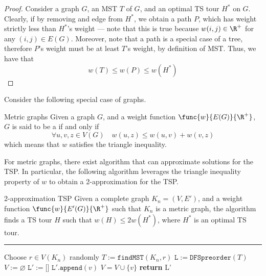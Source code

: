 \documentclass[a4paper, 12pt]{report}
\begin{document}
    \begin{proof}
        Consider a graph $G$, an MST $T$ of $G$, and an optimal TS tour $H^*$ on $G$. Clearly, if by removing and edge from $H^*$, we obtain a path $P$, which has weight strictly less than $H^*$'s weight --- note that this is true because $w(i, j) \in \R^+$ for any $(i, j) \in E(G)$. Moreover, note that a path is a special case of a tree, therefore $P$'s weight must be at least $T$'s weight, by definition of MST. Thus, we have that $$w(T) \le w(P) \le w(H^*)$$
    \end{proof}

    Consider the following special case of graphs.

    \begin{frameddefn}{Metric graphs}
        Given a graph $G$, and a weight function $\func{w}{E(G)}{\R^+}$, $G$ is said to be a  if and only if $$\forall u, v, z \in V(G) \quad w(u, z) \le w(u, v) + w(v, z)$$ which means that $w$ satisfies the triangle inequality.
    \end{frameddefn}

    For metric graphs, there exist algorithm that can approximate solutions for the TSP. In particular, the following algorithm leverages the triangle inequality property of $w$ to obtain a 2-approximation for the TSP.

    \begin{framedalgo}{2-approximation TSP}
        Given a complete graph $K_n = (V, E')$, and a weight function $\func{w}{E'(G)}{\R^+}$ such that $K_n$ is a metric graph, the algorithm finds a TS tour $H$ such that $w(H) \le 2w(H^*)$, where $H^*$ is an optimal TS tour. \\
        \hrule

        \quad
        \label{alg:2-approx_tsp}
        \begin{algorithmic}[1]
                \State Choose $r \in V(K_n)$ randomly
                \State $T := \texttt{findMST}(K_n, r)$ 
                \State $\texttt L := \texttt{DFSpreorder}(T)$ 
                \State $V := \varnothing$
                \State $\texttt L' := \texttt{[]}$
                        \State $\texttt L'.\texttt{append}(v)$
                        \State $V = V \cup \{v\}$
                    \EndIf
                \EndFor
                \State \textbf{return} \ttt L' 
            \EndFunction
        \end{algorithmic}
    \end{framedalgo}
\end{document}
